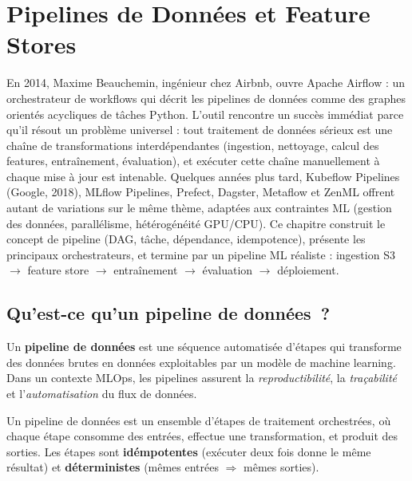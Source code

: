 \chapter{Pipelines de Donn\'ees et Feature Stores}
\label{ch:pipelines}

En 2014, Maxime Beauchemin, ingénieur chez Airbnb, ouvre Apache Airflow : un orchestrateur de workflows qui décrit les pipelines de données comme des graphes orientés acycliques de tâches Python. L'outil rencontre un succès immédiat parce qu'il résout un problème universel : tout traitement de données sérieux est une chaîne de transformations interdépendantes (ingestion, nettoyage, calcul des features, entraînement, évaluation), et exécuter cette chaîne manuellement à chaque mise à jour est intenable. Quelques années plus tard, Kubeflow Pipelines (Google, 2018), MLflow Pipelines, Prefect, Dagster, Metaflow et ZenML offrent autant de variations sur le même thème, adaptées aux contraintes ML (gestion des données, parallélisme, hétérogénéité GPU/CPU). Ce chapitre construit le concept de pipeline (DAG, tâche, dépendance, idempotence), présente les principaux orchestrateurs, et termine par un pipeline ML réaliste : ingestion S3 $\to$ feature store $\to$ entraînement $\to$ évaluation $\to$ déploiement.

\section{Qu'est-ce qu'un pipeline de donn\'ees~?}
\label{sec:data-pipeline-def}

Un \textbf{pipeline de donn\'ees} est une
s\'equence automatis\'ee d'\'etapes qui transforme des donn\'ees brutes en
donn\'ees exploitables par un mod\`ele de machine learning. Dans un contexte
MLOps, les pipelines assurent la \emph{reproductibilit\'e}, la
\emph{tra\c{c}abilit\'e} et l'\emph{automatisation} du flux de donn\'ees.

\begin{definition}
Un pipeline de donn\'ees est un ensemble d'\'etapes de traitement
orchestr\'ees, o\`u chaque \'etape consomme des entr\'ees, effectue une
transformation, et produit des sorties. Les \'etapes sont
\textbf{id\'empotentes} (ex\'ecuter deux fois donne le m\^eme r\'esultat)
et \textbf{d\'eterministes} (m\^emes entr\'ees $\Rightarrow$ m\^emes
sorties).
\end{definition}


